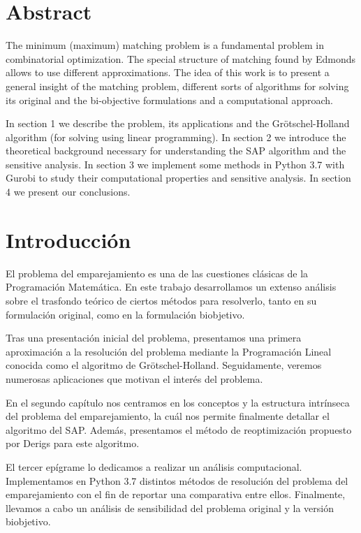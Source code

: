 \documentclass[twoside,a4paper,openright,12pt]{book}
\begin{document}
\newpage
\thispagestyle{empty}

\tableofcontents
\newpage
\thispagestyle{empty}

\chapter*{Abstract}
The minimum (maximum) matching problem is a fundamental problem in combinatorial optimization. The special structure of matching found by Edmonds allows to use different approximations. The idea of this work is to present a general insight of the matching problem, different sorts of algorithms for solving its original and the bi-objective formulations and a computational approach. 

In section 1 we describe the problem, its applications and the Grötschel-Holland algorithm (for solving using linear programming). In section 2 we introduce the theoretical background necessary for understanding the SAP algorithm and the sensitive analysis. In section 3 we implement some methods in Python 3.7 with Gurobi to study their computational properties and sensitive analysis. In section 4 we present our conclusions.
\newpage
\thispagestyle{empty}

\chapter*{Introducci\'on}\label{cap.introduccion}
El problema del emparejamiento es una de las cuestiones clásicas de la Programación Matemática. En este trabajo desarrollamos un extenso análisis sobre el trasfondo teórico de ciertos métodos para resolverlo, tanto en su formulación original, como en la formulación biobjetivo.

Tras una presentación inicial del problema, presentamos una primera aproximación a la resolución del problema mediante la Programación Lineal conocida como el algoritmo de Grötschel-Holland. Seguidamente, veremos numerosas aplicaciones que motivan el interés del problema.

En el segundo capítulo nos centramos en los conceptos y la estructura intrínseca del problema del emparejamiento, la cuál nos permite finalmente detallar el algoritmo del SAP. Además, presentamos el método de reoptimización propuesto por Derigs para este algoritmo.

El tercer epígrame lo dedicamos a realizar un análisis computacional. Implementamos en Python 3.7 distintos métodos de resolución del problema del emparejamiento con el fin de reportar una comparativa entre ellos. Finalmente, llevamos a cabo un análisis de sensibilidad del problema original y la versión biobjetivo.
\end{document}
